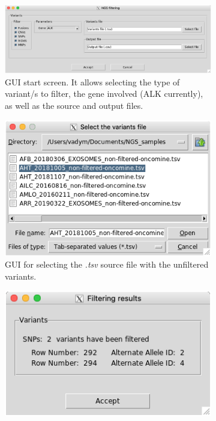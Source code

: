 \begin{figure}[ht]
    \centering
    \begin{subfigure}{\textwidth}
        \centering
        \includegraphics[width=\textwidth]{Images/chapter_4/GUI_1.png}
        \caption{GUI start screen. It allows selecting the type of variant\slash s to filter, the gene involved (ALK currently), as well as the source and output files. \\}
        \label{fig:GUI_1}
    \end{subfigure}
    \hfill
    \begin{subfigure}{0.47\textwidth}
        \centering
        \includegraphics[width=\textwidth]{Images/chapter_4/GUI_2.png}
        \caption{GUI for selecting the \textit{.tsv} source file with the unfiltered variants.}
        \label{fig:GUI_2}
    \end{subfigure}
    \hfill
    \hfill
    \begin{subfigure}{0.52\textwidth}
        \centering
        \includegraphics[width=\textwidth]{Images/chapter_4/GUI_3.png}

\end{subfigure}
\end{figure}
